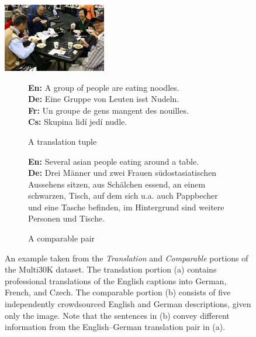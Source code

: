 %
\begin{figure}
  \begin{center}
    \includegraphics[width=0.4\textwidth]{chapters/ConLL/10459869.jpg}
  \end{center}
  \vspace{1em}
  \begin{subfigure}[t]{0.5\textwidth}
    \textbf{En:} A group of people are eating noodles.\\[0.5ex]
    \textbf{De:} Eine Gruppe von Leuten isst Nudeln.\\[0.5ex]
    \textbf{Fr:} Un groupe de gens mangent des nouilles.\\[0.5ex]
    \textbf{Cs:} Skupina lidí jedí nudle.\\
    \vspace{2em}
    \caption{A translation tuple}
  \end{subfigure}
  \begin{subfigure}[t]{0.5\textwidth}
    \textbf{En:} Several asian people eating around a table.\\[0.5ex]
    \textbf{De:} Drei Männer und zwei Frauen südostasiatischen Aussehens sitzen, aus Schälchen essend, an einem schwarzen, Tisch, auf dem sich u.a. auch Pappbecher und eine Tasche befinden, im Hintergrund sind weitere Personen und Tische.\footnotemark\\
    \caption{A comparable pair}
  \end{subfigure}
  \caption{An example taken from the {\it Translation} and {\it Comparable} portions of the Multi30K dataset. The translation portion (a) contains professional translations of the English captions into German, French, and Czech. The comparable portion (b) consists of five independently crowdsourced English and German descriptions, given only the image. Note that the sentences in (b) convey different information from the English--German translation pair in (a).}\label{fig:data:example}
\end{figure}
